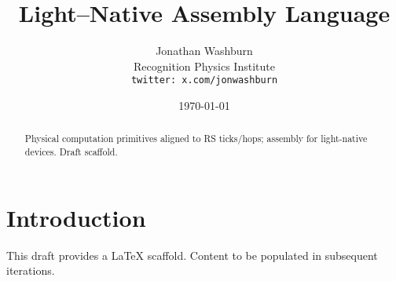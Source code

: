 \documentclass[11pt,letterpaper]{article}
\title{Light--Native Assembly Language}
\author{Jonathan Washburn\\Recognition Physics Institute\\\texttt{twitter: x.com/jonwashburn}}
\date{\today}
\begin{document}
\maketitle
\begin{abstract}
Physical computation primitives aligned to RS ticks/hops; assembly for light-native devices. Draft scaffold.
\end{abstract}
\section{Introduction}
This draft provides a LaTeX scaffold. Content to be populated in subsequent iterations.
\end{document}
